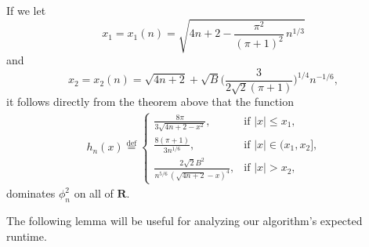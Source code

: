 \documentclass[10pt]{article}
\theoremstyle{definition}
\theoremstyle{remark}
\newcommand{\1}{\mathbbm{1}}
\newcommand{\0}{\mathbbm{0}}
\renewcommand{\mathbb}{\mathbf}
\begin{document}
If we let 
\[
    x_1=x_1(n)=\sqrt{4n+2-\frac{\pi^2}{(\pi+1)^2}\,n^{1/3}}
\]
and
\[
    x_2=x_2(n)=\sqrt{4n+2}+\sqrt{B}\bigg(\frac{3}{2\sqrt{2}(\pi+1)}\bigg)^{1/4}n^{-1/6},
\]
it follows directly from the theorem above that the function 
\begin{align*}
    h_n(x) \stackrel{\text{def}}{=} \begin{cases}
       \frac{8\pi}{3\sqrt{4n+2-x^2}}, & \text{if $|x|\leq x_1$,} \\
        \frac{8(\pi+1)}{3 n^{1/6}} ,       & \text{if $|x|\in (x_1, x_2]$,} \\
        \frac{2\sqrt{2}B^2} {n^{5/6}\,(\sqrt{4n+2}-x)^{4}},   & \text{if $|x|> x_2$,}
    \end{cases}
\end{align*}
dominates $\phi_n^2$ on all of $\mathbb{R}$. 

The following lemma will be useful for analyzing our algorithm's expected runtime.
\end{document}
